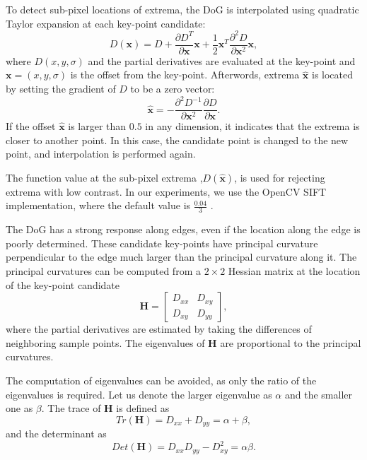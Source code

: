 To detect sub-pixel locations of extrema, the DoG is interpolated using quadratic Taylor expansion at each key-point candidate:
\begin{equation}
    D(\boldsymbol{x}) = D + \frac{\partial D^T}{\partial \boldsymbol{x}}\boldsymbol{x}+\frac{1}{2}\boldsymbol{x}^T\frac{\partial^2 D}{\partial \boldsymbol{x}^2}\boldsymbol{x},
    \label{eq:taylor_expansion}
\end{equation}
where \( D(x,y,\sigma) \) and the partial derivatives are evaluated at the key-point and \( \boldsymbol{x}=(x,y,\sigma) \) is the offset from the key-point. Afterwords, extrema \( \hat{\boldsymbol{x}} \) is located by setting the gradient of \( D \) to be a zero vector:
\begin{equation}
    \hat{\boldsymbol{x}} = - \frac{\partial^2 D^{-1}}{\partial \boldsymbol{x}^2}\frac{\partial D}{\partial \boldsymbol{x}}.
    \label{eq:taylor_extremum}
\end{equation}
If the offset \( \hat{\boldsymbol{x}} \) is larger than \( 0.5 \) in any dimension, it indicates that the extrema is closer to another point. In this case, the candidate point is changed to the new point, and interpolation is performed again.

The function value at the sub-pixel extrema ,$D(\hat{\boldsymbol{x}})$, is used for rejecting extrema with low contrast. In our experiments, we use the OpenCV SIFT implementation, where the default value is $\frac{0.04}{3}$ \cite{openCV}.

The DoG has a strong response along edges, even if the location along the edge is poorly determined. These candidate key-points have principal curvature perpendicular to the edge much larger than the principal curvature along it. The principal curvatures can be computed from a $2\times2$ Hessian matrix at the location of the key-point candidate
\begin{equation}
    \boldsymbol{H} =
    \begin{bmatrix}
        D_{xx} & D_{xy}\\
        D_{xy} & D_{yy}
    \end{bmatrix},
    \label{eq:hessian}
\end{equation}
where the partial derivatives are estimated by taking the differences of neighboring sample points. The eigenvalues of $\boldsymbol{H}$ are proportional to the principal curvatures.

The computation of eigenvalues can be avoided, as only the ratio of the eigenvalues is required. Let us denote the larger eigenvalue as $\alpha$ and the smaller one as $\beta$. The trace of $\boldsymbol{H}$ is defined as
\begin{equation}
    Tr(\boldsymbol{H}) = D_{xx}+D_{yy} = \alpha+\beta,
\end{equation}
and the determinant as
\begin{equation}
    Det(\boldsymbol{H}) = D_{xx}D_{yy}-D_{xy}^2 = \alpha\beta.
\end{equation}

